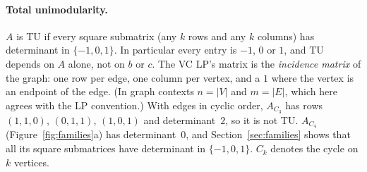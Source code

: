 \paragraph{Total unimodularity.} $A$ is TU if every square submatrix (any $k$ rows and any $k$ columns) has determinant in $\{-1,0,1\}$. In particular every entry is $-1$, $0$ or $1$, and TU depends on $A$ alone, not on $b$ or $c$. The VC LP's matrix is the \emph{incidence matrix} of the graph: one row per edge, one column per vertex, and a $1$ where the vertex is an endpoint of the edge. (In graph contexts $n=|V|$ and $m=|E|$, which here agrees with the LP convention.) With edges in cyclic order, $A_{C_3}$ has rows $(1,1,0)$, $(0,1,1)$, $(1,0,1)$ and determinant~$2$, so it is not TU. $A_{C_4}$ (Figure~\ref{fig:families}a) has determinant~$0$, and Section~\ref{sec:families} shows that all its square submatrices have determinant in $\{-1,0,1\}$. $C_k$ denotes the cycle on $k$ vertices.
